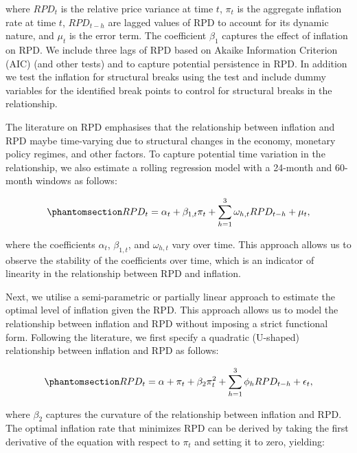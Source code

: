 \documentclass[
  letterpaper,
  DIV=11,
  numbers=noendperiod]{scrartcl}
\begin{document}
where \(RPD_{t}\) is the relative price variance at time \(t\),
\(\pi_{t}\) is the aggregate inflation rate at time \(t\), \(RPD_{t-h}\)
are lagged values of RPD to account for its dynamic nature, and
\(\mu_{t}\) is the error term. The coefficient \(\beta_1\) captures the
effect of inflation on RPD. We include three lags of RPD based on Akaike
Information Criterion (AIC) (and other tests) and to capture potential
persistence in RPD. In addition we test the inflation for structural
breaks using the \citet{bai1998a} test and include dummy variables for
the identified break points to control for structural breaks in the
relationship.

The literature on RPD emphasises that the relationship between inflation
and RPD maybe time-varying due to structural changes in the economy,
monetary policy regimes, and other factors. To capture potential time
variation in the relationship, we also estimate a rolling regression
model with a 24-month and 60-month windows as follows:

\begin{equation}\phantomsection\label{eq-rpd_rolling_reg}{RPD_{t} = \alpha_{t} + \beta_{1,t}\pi_{t} + \sum_{h=1}^{3}\omega_{h,t}RPD_{t-h}  +  \mu_{t}, }\end{equation}

where the coefficients \(\alpha_{t}\), \(\beta_{1,t}\), and
\(\omega_{h,t}\) vary over time. This approach allows us to observe the
stability of the coefficients over time, which is an indicator of
linearity in the relationship between RPD and inflation.

Next, we utilise a semi-parametric or partially linear approach to
estimate the optimal level of inflation given the RPD. This approach
allows us to model the relationship between inflation and RPD without
imposing a strict functional form. Following the literature, we first
specify a quadratic (U-shaped) relationship between inflation and RPD as
follows:

\begin{equation}\phantomsection\label{eq-rpd_semi_parametric}{RPD_t = \alpha + \pi_t + \beta_2\pi_t^2 + \sum_{h=1}^{3}\phi_hRPD_{t-h} + \epsilon_t, }\end{equation}

where \(\beta_2\) captures the curvature of the relationship between
inflation and RPD. The optimal inflation rate that minimizes RPD can be
derived by taking the first derivative of the equation with respect to
\(\pi_t\) and setting it to zero, yielding:
\end{document}

